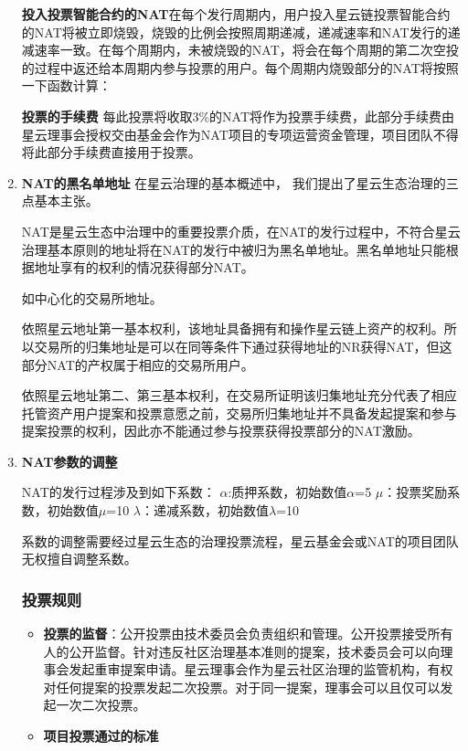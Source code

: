 \begin{enumerate}
\textbf{投入投票智能合约的NAT}在每个发行周期内，用户投入星云链投票智能合约的NAT将被立即烧毁，烧毁的比例会按照周期递减，递减速率和NAT发行的递减速率一致。在每个周期内，未被烧毁的NAT，将会在每个周期的第二次空投的过程中返还给本周期内参与投票的用户。每个周期内烧毁部分的NAT将按照一下函数计算：

\textbf{投票的手续费}
每此投票将收取3\%的NAT将作为投票手续费，此部分手续费由星云理事会授权交由基金会作为NAT项目的专项运营资金管理，项目团队不得将此部分手续费直接用于投票。

\item \textbf{NAT的黑名单地址}
在星云治理的基本概述中， 我们提出了星云生态治理的三点基本主张。

NAT是星云生态中治理中的重要投票介质，在NAT的发行过程中，不符合星云治理基本原则的地址将在NAT的发行中被归为黑名单地址。黑名单地址只能根据地址享有的权利的情况获得部分NAT。

如中心化的交易所地址。

依照星云地址第一基本权利，该地址具备拥有和操作星云链上资产的权利。所以交易所的归集地址是可以在同等条件下通过获得地址的NR获得NAT，但这部分NAT的产权属于相应的交易所用户。

依照星云地址第二、第三基本权利，在交易所证明该归集地址充分代表了相应托管资产用户提案和投票意愿之前，交易所归集地址并不具备发起提案和参与提案投票的权利，因此亦不能通过参与投票获得投票部分的NAT激励。

\item \textbf{NAT参数的调整}

	NAT的发行过程涉及到如下系数：
	$α$:质押系数，初始数值$α$=5
	$μ$：投票奖励系数，初始数值$μ$=10
	$λ$：递减系数，初始数值$λ$=10

	系数的调整需要经过星云生态的治理投票流程，星云基金会或NAT的项目团队无权擅自调整系数。

\subsubsection{投票规则}

\begin{itemize}

	\item \textbf{投票的监督}：公开投票由技术委员会负责组织和管理。公开投票接受所有人的公开监督。针对违反社区治理基本准则的提案，技术委员会可以向理事会发起重审提案申请。星云理事会作为星云社区治理的监管机构，有权对任何提案的投票发起二次投票。对于同一提案，理事会可以且仅可以发起一次二次投票。
	
	\item \textbf{项目投票通过的标准}
	

\end{itemize}
\end{enumerate}
